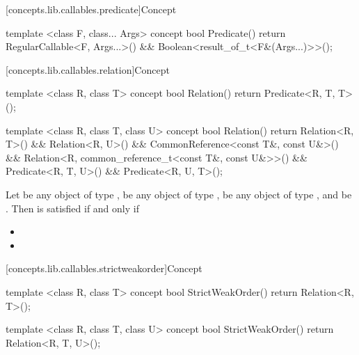 [concepts.lib.callables.predicate]{Concept }

%
\begin{itemdecl}
template <class F, class... Args>
concept bool Predicate() {
  return RegularCallable<F, Args...>() &&
    Boolean<result_of_t<F&(Args...)>>();
}
\end{itemdecl}

[concepts.lib.callables.relation]{Concept }

%
\begin{itemdecl}
template <class R, class T>
concept bool Relation() {
  return Predicate<R, T, T>();
}

template <class R, class T, class U>
concept bool Relation() {
  return Relation<R, T>() &&
    Relation<R, U>() &&
    CommonReference<const T&, const U&>() &&
    Relation<R,
      common_reference_t<const T&, const U&>>() &&
    Predicate<R, T, U>() &&
    Predicate<R, U, T>();
}
\end{itemdecl}

\begin{itemdescr}
\pnum
Let  be any object of type ,  be any
object of type ,  be any
object of type , and  be
.
Then  is satisfied if and only if

\begin{itemize}
\item {}
\item {}
\end{itemize}
\end{itemdescr}

[concepts.lib.callables.strictweakorder]{Concept }

%
\begin{itemdecl}
template <class R, class T>
concept bool StrictWeakOrder() {
  return Relation<R, T>();
}

template <class R, class T, class U>
concept bool StrictWeakOrder() {
  return Relation<R, T, U>();
}
\end{itemdecl}

